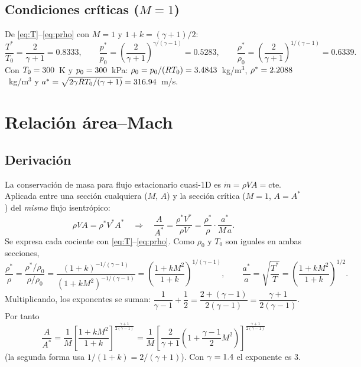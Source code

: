 \documentclass[11pt,a4paper]{article}
\newcommand{\As}{A^{*}}
\begin{document}
\subsection{Condiciones críticas ($M=1$)}
De \eqref{eq:T}--\eqref{eq:prho} con $M=1$ y $1+k=(\gamma+1)/2$:
\[
\frac{T^*}{T_0}=\frac{2}{\gamma+1}=0.8333,\qquad
\frac{p^*}{p_0}=\left(\frac{2}{\gamma+1}\right)^{\gamma/(\gamma-1)}=0.5283,\qquad
\frac{\rho^*}{\rho_0}=\left(\frac{2}{\gamma+1}\right)^{1/(\gamma-1)}=0.6339.
\]
Con $T_0=300$~K y $p_0=300$~kPa: $\rho_0=p_0/(RT_0)=3.4843$~kg/m$^3$,
$\rho^*=2.2088$~kg/m$^3$ y $a^*=\sqrt{2\gamma RT_0/(\gamma+1)}=316.94$~m/s.

\section{Relación área--Mach}
\subsection{Derivación}
La conservación de masa para flujo estacionario cuasi-1D es $\dot m=\rho VA=\text{cte}$. Aplicada entre una sección
cualquiera ($M$, $A$) y la sección crítica ($M=1$, $A=\As$) del \emph{mismo} flujo isentrópico:
\[
\rho V A=\rho^*V^*\As
\quad\Longrightarrow\quad
\frac{A}{\As}=\frac{\rho^*V^*}{\rho V}=\frac{\rho^*}{\rho}\cdot\frac{a^*}{M\,a}.
\]
Se expresa cada cociente con \eqref{eq:T}--\eqref{eq:prho}. Como $\rho_0$ y $T_0$ son iguales en ambas secciones,
\[
\frac{\rho^*}{\rho}=\frac{\rho^*/\rho_0}{\rho/\rho_0}=\frac{\left(1+k\right)^{-1/(\gamma-1)}}{\left(1+kM^2\right)^{-1/(\gamma-1)}}=\left(\frac{1+kM^2}{1+k}\right)^{1/(\gamma-1)},
\qquad
\frac{a^*}{a}=\sqrt{\frac{T^*}{T}}=\left(\frac{1+kM^2}{1+k}\right)^{1/2}.
\]
Multiplicando, los exponentes se suman: $\dfrac{1}{\gamma-1}+\dfrac12=\dfrac{2+(\gamma-1)}{2(\gamma-1)}=\dfrac{\gamma+1}{2(\gamma-1)}$. Por tanto
\begin{equation}
\boxed{\frac{A}{\As}=\frac{1}{M}\left[\frac{1+kM^2}{1+k}\right]^{\frac{\gamma+1}{2(\gamma-1)}}
=\frac{1}{M}\left[\frac{2}{\gamma+1}\left(1+\frac{\gamma-1}{2}M^2\right)\right]^{\frac{\gamma+1}{2(\gamma-1)}}}\label{eq:AM}
\end{equation}
(la segunda forma usa $1/(1+k)=2/(\gamma+1)$). Con $\gamma=1.4$ el exponente es $3$.
\end{document}
